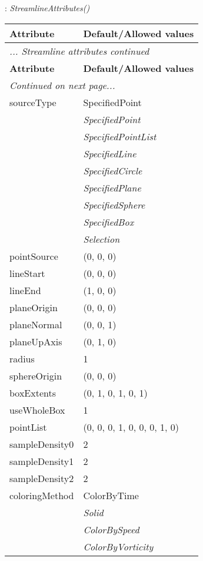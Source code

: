 \documentclass[10pt,a4paper]{report}
\begin{document}
\newpage

{}
: {\it StreamlineAttributes() }\\[-3mm]

\begin{longtable}{ll}
{\bf Attribute} & {\bf Default/Allowed values} \\
\hline \hline
\endfirsthead
\multicolumn{2}{l}{{\it ... Streamline attributes continued}} \\
{\bf Attribute} & {\bf Default/Allowed values} \\
\hline \hline
\endhead
\hline
\multicolumn{2}{l}{{\it Continued on next page...}} \\
\endfoot
\hline
\endlastfoot

sourceType  &  SpecifiedPoint   \\
 & {\it  SpecifiedPoint} \\
 & {\it  SpecifiedPointList} \\
 & {\it  SpecifiedLine} \\
 & {\it  SpecifiedCircle} \\
 & {\it  SpecifiedPlane} \\
 & {\it  SpecifiedSphere} \\
 & {\it  SpecifiedBox} \\
 & {\it  Selection} \\
pointSource  &  (0, 0, 0) \\
lineStart  &  (0, 0, 0) \\
lineEnd  &  (1, 0, 0) \\
planeOrigin  &  (0, 0, 0) \\
planeNormal  &  (0, 0, 1) \\
planeUpAxis  &  (0, 1, 0) \\
radius  &  1 \\
sphereOrigin  &  (0, 0, 0) \\
boxExtents  &  (0, 1, 0, 1, 0, 1) \\
useWholeBox  &  1 \\
pointList  &  (0, 0, 0, 1, 0, 0, 0, 1, 0) \\
sampleDensity0  &  2 \\
sampleDensity1  &  2 \\
sampleDensity2  &  2 \\
coloringMethod  &  ColorByTime   \\
 & {\it  Solid} \\
 & {\it  ColorBySpeed} \\
 & {\it  ColorByVorticity} \\

\end{longtable}
\end{document}
